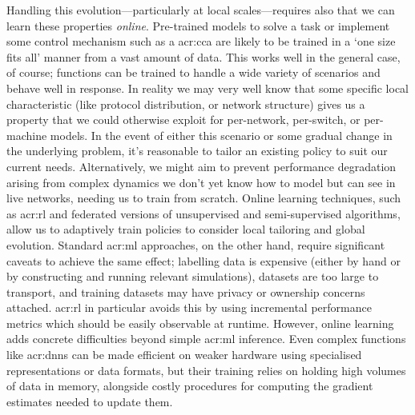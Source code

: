 Handling this evolution---particularly at local scales---requires also that we can learn these properties \emph{online}.
Pre-trained models to solve a task or implement some control mechanism such as a \gls{acr:cca} are likely to be trained in a `one size fits all' manner from a vast amount of data.
This works well in the general case, of course; functions can be trained to handle a wide variety of scenarios and behave well in response.
In reality we may very well know that some specific local characteristic (like protocol distribution, or network structure) gives us a property that we could otherwise exploit for per-network, per-switch, or per-machine models.
In the event of either this scenario or some gradual change in the underlying problem, it's reasonable to tailor an existing policy to suit our current needs.
Alternatively, we might aim to prevent performance degradation arising from complex dynamics we don't yet know how to model but can see in live networks, needing us to train from scratch.
Online learning techniques, such as \gls{acr:rl} and federated versions of unsupervised and semi-supervised algorithms, allow us to adaptively train policies to consider local tailoring and global evolution.
Standard \gls{acr:ml} approaches, on the other hand, require significant caveats to achieve the same effect; labelling data is expensive (either by hand or by constructing and running relevant simulations), datasets are too large to transport, and training datasets may have privacy or ownership concerns attached.
\gls{acr:rl} in particular avoids this by using incremental performance metrics which should be easily observable at runtime.
However, online learning adds concrete difficulties beyond simple \gls{acr:ml} inference.
Even complex functions like \glspl{acr:dnn} can be made efficient on weaker hardware using specialised representations or data formats, but their training relies on holding high volumes of data in memory, alongside costly procedures for computing the gradient estimates needed to update them.
 
%

